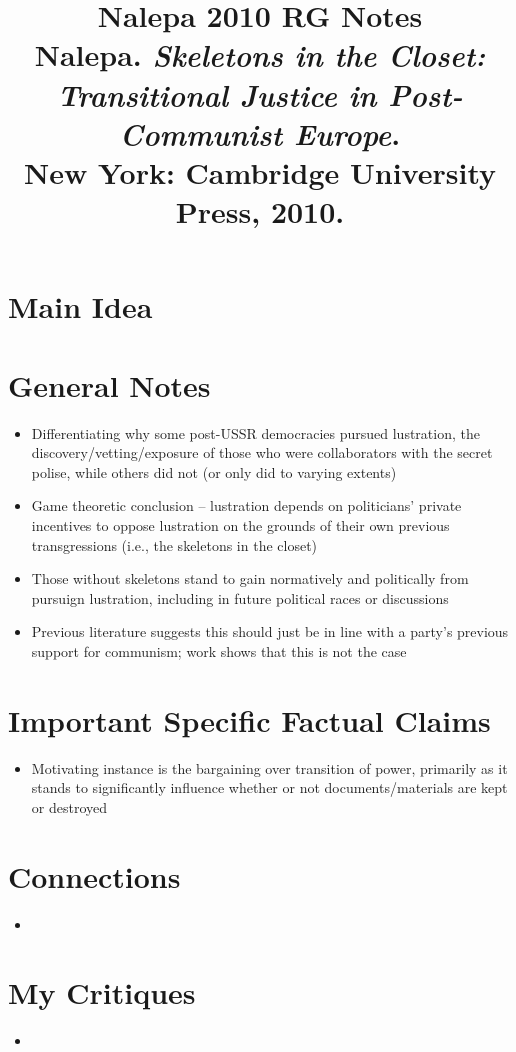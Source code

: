 \documentclass[12pt]{article}
\title{\textbf{Nalepa 2010 RG Notes}\\
\large Nalepa. \textit{Skeletons in the Closet: Transitional Justice in Post-Communist Europe}.\\
New York: Cambridge University Press, 2010.}
\author{}
\date{}
\begin{document}
\maketitle

\section{Main Idea}



\section{General Notes}

\begin{itemize}[leftmargin=*, itemsep=4pt]
    \item Differentiating why some post-USSR democracies pursued lustration, the discovery/vetting/exposure of those who were collaborators with the secret polise, while others did not (or only did to varying extents)
    \item Game theoretic conclusion -- lustration depends on politicians' private incentives to oppose lustration on the grounds of their own previous transgressions (i.e., the skeletons in the closet)
    \item Those without skeletons stand to gain normatively and politically from pursuign lustration, including in future political races or discussions
    \item Previous literature suggests this should just be in line with a party's previous support for communism; work shows that this is not the case
\end{itemize}


\section{Important Specific Factual Claims}

\begin{itemize}[leftmargin=*, itemsep=4pt]
    \item Motivating instance is the bargaining over transition of power, primarily as it stands to significantly influence whether or not documents/materials are kept or destroyed
\end{itemize}


\section{Connections}

\begin{itemize}[leftmargin=*, itemsep=4pt]
    \item
\end{itemize}


\section{My Critiques}

\begin{itemize}[leftmargin=*, itemsep=4pt]
    \item
\end{itemize}
\end{document}
